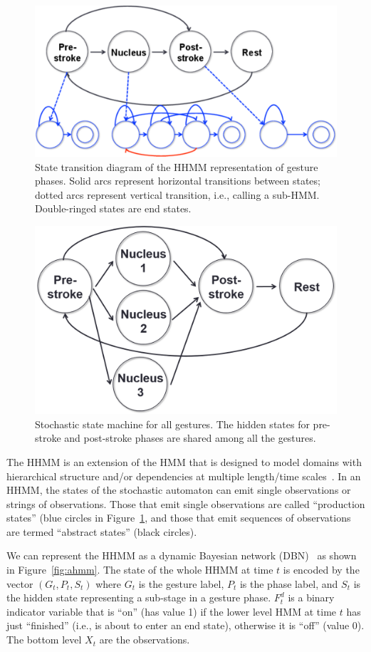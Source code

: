 \begin{figure}[tbh]
\centering
\includegraphics[clip, width=0.7\columnwidth]{figures/hhmm.pdf}
\caption{State transition diagram of the HHMM representation of gesture phases.
Solid arcs represent horizontal transitions between states; dotted arcs
represent vertical transition, i.e., calling a sub-HMM. Double-ringed states
are end states.}
\label{fig:hhmm}
\end{figure}

\begin{figure}[tbh]
\centering
\includegraphics[width=0.7\columnwidth]{figures/combined.png}
\caption{Stochastic state machine for all gestures. The
hidden states for pre-stroke and post-stroke phases are shared among all the
gestures.
}
\label{fig:combined}
\end{figure}

The HHMM is an extension of the HMM that is designed to model domains with
hierarchical structure and/or dependencies at multiple length/time
scales~\cite{murphy02}. In an HHMM, the states of the stochastic automaton can
emit single observations or strings of observations. Those that emit single
observations are called ``production states'' (blue circles in
Figure~\ref{fig:hhmm}, and those that emit sequences of observations are termed
``abstract states'' (black circles). 

We can represent the HHMM as a dynamic Bayesian network (DBN)~\cite{murphy02} as
shown in Figure~\ref{fig:ahmm}.
The state of the whole HHMM at time $t$ is encoded by the vector $(G_t, P_t, S_t)$ where $G_t$ is the gesture label, $P_t$ is the
phase label, and $S_t$ is the hidden state representing a sub-stage in a
gesture phase. $F_t^d$ is a binary indicator variable that is
``on'' (has value 1) if the lower level HMM at time $t$ has just ``finished''
(i.e., is about to enter an end state), otherwise it is ``off'' (value 0).
The bottom level $X_t$ are the observations. 

